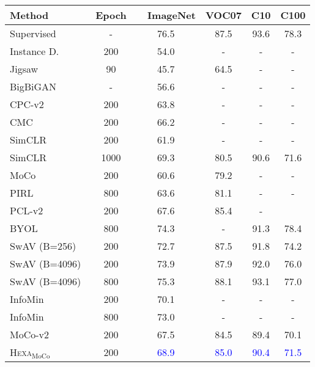 \documentclass[10pt,twocolumn,letterpaper]{article}
\newcommand{\shortname}{\textsc{Hexa}}
\begin{document}
\begin{table}[t!]
\footnotesize \centering
\begin{tabular}{ @{\hspace{-0pt}}l@{\hspace{8pt}}c@{\hspace{2pt}}|@{\hspace{7pt}}c@{\hspace{7pt}}c@{\hspace{7pt}}c@{\hspace{7pt}}c}\toprule
 Method   & Epoch &  ~~ImageNet  &  VOC07 &  C10 &  C100  \\ 
\hline
Supervised & - & 76.5 &  87.5 & 93.6 & 78.3 \\
\hline
Instance D.~\cite{wu2018unsupervised} & 200 & 54.0 &  - & -  & -\\ Jigsaw~\cite{noroozi2016unsupervised} & 90 & 45.7 & 64.5 & - & -\\ BigBiGAN~\cite{donahue2019large} & - & 56.6 & - &  - & -\\
CPC-v2~\cite{henaff2019data} & 200 & 63.8 & - & - & -\\
CMC~\cite{tian2019contrastive} & 200 &  66.2 & - & - & -\\
SimCLR~\cite{chen2020simple} & 200 & 61.9 & -  & - & -\\
SimCLR~\cite{chen2020simple} & 1000 & 69.3 & 80.5 & 90.6 & 71.6 \\
MoCo~\cite{he2020momentum} & 200 & 60.6 & 79.2 & - & - \\ PIRL~\cite{misra2020self} & 800 & 63.6 & 81.1 & - & - \\ PCL-v2~\cite{li2020prototypical} & 200 & 67.6 & 85.4 & - & \\BYOL~\cite{grill2020bootstrap} & 800 & 74.3 & - & 91.3 & 78.4 \\
SwAV \!(B=256)\!~\cite{caron2020unsupervised} & 200 & 72.7 & 87.5 & 91.8 & 74.2 \\
SwAV \!(B=4096)\!~\cite{caron2020unsupervised} & 200 & 73.9 &  87.9 & 92.0 & 76.0 \\
SwAV \!(B=4096)\!~\cite{caron2020unsupervised} & 800 & 75.3 &  88.1 & 93.1 & 77.0 \\
InfoMin~\cite{tian2020makes} & 200 & 70.1 & - & - & -\\
InfoMin~\cite{tian2020makes} & 800 & 73.0 & - & - & - \\
\hline
 MoCo-v2~~ &  200  & 67.5 & 84.5 & 89.4 & 70.1\\
\rowcolor{Gray}
\cellcolor{white}
   \shortname{}$_{\text{MoCo}}$  &  200   & \textcolor{blue}{68.9} & \textcolor{blue}{85.0} & \textcolor{blue}{90.4} &  \textcolor{blue}{71.5}

\end{tabular}
\end{table}
\end{document}

